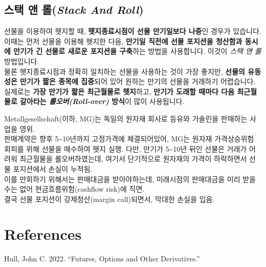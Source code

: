 \documentclass[
  letterpaper,
  DIV=11,
  numbers=noendperiod]{scrreprt}
\newlength{\cslhangindent}
\newenvironment{CSLReferences}[2] %
 {\begin{list}{}{%
  \setlength{\itemindent}{0pt}
  \setlength{\leftmargin}{0pt}
  \setlength{\parsep}{0pt}
  \ifodd #1
   \setlength{\leftmargin}{\cslhangindent}
   \setlength{\itemindent}{-1\cslhangindent}
  \fi
  \setlength{\itemsep}{#2\baselineskip}}}
 {\end{list}}
\begin{document}
\section{\texorpdfstring{스택 앤 롤(\emph{Stack And
Roll})}{스택 앤 롤(Stack And Roll)}}\label{uxc2a4uxd0dd-uxc564-uxb864stack-and-roll}

선물을 이용하여 헷지할 때, \textbf{헷지종료시점이 선물 만기일보다
나중}인 경우가 있습니다. 이때는 먼저 선물을 이용해 헷지한 다음,
\textbf{만기일 직전에 선물 포지션을 청산함과 동시에 만기가 긴 선물로
새로운 포지션을 구축}하는 방법을 사용합니다. 이것이 \emph{스택 앤 롤}
방법입니다.\\
물론 헷지종료시점과 정확히 일치하는 선물을 사용하는 것이 가장 좋지만,
\textbf{선물의 유동성은 만기가 짧은 종목에 집중}되어 있어 원하는 만기의
선물을 거래하기 어렵습니다. 실제로는 \textbf{가장 만기가 짧은 최근월물로
헷지}하고, \textbf{만기가 도래할 때마다 다음 최근월물로 갈아타는
\emph{롤오버(Roll-over)} 방식}이 많이 사용됩니다.

\begin{tcolorbox}[enhanced jigsaw, opacitybacktitle=0.6, leftrule=.75mm, colback=white, toptitle=1mm, breakable, colframe=quarto-callout-tip-color-frame, bottomtitle=1mm, coltitle=black, titlerule=0mm, arc=.35mm, toprule=.15mm, rightrule=.15mm, bottomrule=.15mm, title=\textcolor{quarto-callout-tip-color}{\faLightbulb}\hspace{0.5em}{Stack and Roll의 위험성 : Metallgesellschaft 사례}, colbacktitle=quarto-callout-tip-color!10!white, left=2mm, opacityback=0]

Metallgesellschaft(이하, MG)는 독일의 원자재 회사로 등유와 가솔린을
판매하는 사업을 영위.\\
판매계약은 향후 5\textasciitilde10년까지 고정가격에 체결되어있어, MG는
원자재 가격상승위험 회피를 위해 선물을 매수하여 헷지 실행. 다만, 만기가
5\textasciitilde10년 뒤인 선물은 거래가 어려워 최근월물을
롤오버하였는데, 여기서 단기적으로 원자재의 가격이 하락하면서 선물
포지션에서 손실이 누적됨.\\
이를 만회하기 위해서는 판매대금을 받아야하는데, 미래시점의 판매대금을
미리 받을 수는 없어 현금흐름위험(cashflow risk)에 직면.\\
결국 선물 포지션이 강제청산(margin call)되면서, 막대한 손실을 입음.

\end{tcolorbox}


\chapter*{References}\label{references}


\label{refs}
\begin{CSLReferences}{1}{0}
Hull, John C. 2022. {``Futures, Options and Other Derivatives.''}

\end{CSLReferences}
\end{document}
